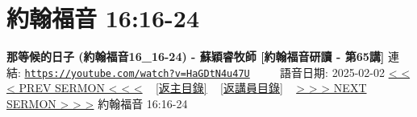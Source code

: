 \documentclass{book}
\begin{document}
\section{約翰福音 16:16-24}
\label{sec:HaGDtN4u47U}
\textbf{那等候的日子 (約翰福音16\_16-24) - 蘇穎睿牧師 [約翰福音研讀 - 第65講]}
\newline
\newline
連結: \href{https://youtube.com/watch?v=HaGDtN4u47U}{\texttt{https://youtube.com/watch?v=HaGDtN4u47U}} ~~~~ 語音日期: 2025-02-02
\newline
\newline
\hyperref[sec:M4alGuubf1o]{< < < PREV SERMON < < <}
~
\hyperlink{toc}{[返主目錄]}
~
\hyperref[ch:preacher10]{[返講員目錄]}
~
\hyperref[sec:fV_h6TniAkc]{> > > NEXT SERMON > > >}
\newline
\newline
約翰福音 16:16-24
\newline
\end{document}
